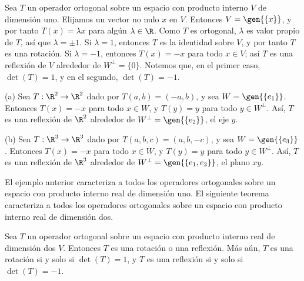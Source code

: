\begin{ejemplo}
    Sea $T$ un operador ortogonal sobre un espacio con producto interno $V$ de dimensión uno. Elijamos un vector no nulo $x$ en $V$. Entonces $V=\gen{\{x\}}$, y por tanto $T(x)=\lambda x$ para algún $\lambda\in\R$. Como $T$ es ortogonal, $\lambda$ es valor propio de $T$, así que $\lambda=\pm 1$. Si $\lambda=1$, entonces $T$ es la identidad sobre $V$, y por tanto $T$ es una rotación. Si $\lambda=-1$, entonces $T(x)=-x$ para todo $x\in V$; así $T$ es una reflexión de $V$ alrededor de $W^\perp=\{0\}$. Notemos que, en el primer caso, $\det(T)=1$, y en el segundo, $\det(T)=-1$.
\end{ejemplo}

\begin{ejemplo}
    (a) Sea $T:\R^2\to\R^2$ dado por $T(a,b)=(-a,b)$, y sea $W=\gen{\{e_1\}}$. Entonces $T(x)=-x$ para todo $x\in W$, y $T(y)=y$ para todo $y\in W^\perp$. Así, $T$ es una reflexión de $\R^2$ alrededor de $W^\perp=\gen{\{e_2\}}$, el eje $y$.

    (b) Sea $T:\R^3\to\R^3$ dado por $T(a,b,c)=(a,b,-c)$, y sea $W=\gen{\{e_3\}}$. Entonces $T(x)=-x$ para todo $x\in W$, y $T(y)=y$ para todo $y\in W^\perp$. Así, $T$ es una reflexión de $\R^3$ alrededor de $W^\perp=\gen{\{e_1,e_2\}}$, el plano $xy$.
\end{ejemplo}

El ejemplo anterior caracteriza a todos los operadores ortogonales sobre un espacio con producto interno real de dimensión uno. El siguiente teorema caracteriza a todos los operadores ortogonales sobre un espacio con producto interno real de dimensión dos.

\begin{teorema}
    Sea $T$ un operador ortogonal sobre un espacio con producto interno real de dimensión dos $V$. Entonces $T$ es una rotación o una reflexión. Más aún, $T$ es una rotación si y solo si $\det(T)=1$, y $T$ es una reflexión si y solo si $\det(T)=-1$.
\end{teorema}

